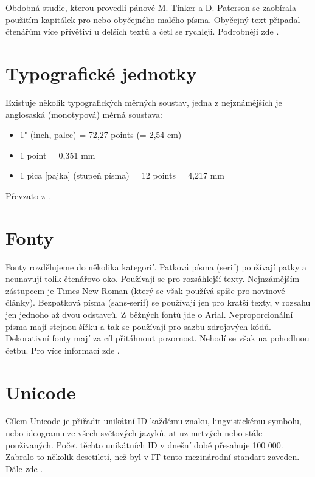 \documentclass[a4paper,11pt]{article}
\begin{document}
Obdobná studie, kterou provedli pánové M. Tinker a  D. Paterson se zaobírala použitím kapitálek pro nebo obyčejného malého písma. Obyčejný text připadal čtenářům více přívětiví u delších textů a četl se rychleji. Podrobněji zde \cite{Guthrie}.

\section{Typografické jednotky}
Existuje několik typografických měrných soustav, jedna z nejznámějších je anglosaská (monotypová) měrná soustava:
\begin{itemize}
    \item 1" (inch, palec) = 72,27 points (= 2,54 cm)
    \item 1 point = 0,351 mm
    \item 1 pica [pajka] (stupeň písma) = 12 points = 4,217 mm
\end{itemize}
Převzato z \cite{jednotky}.

\section{Fonty}
Fonty rozdělujeme do několika kategorií. Patková písma (serif) používají patky a neunavují tolik čtenářovo oko. Používají se pro rozsáhlejší texty. Nejnzámějším zástupcem je Times New Roman (který se však používá spíše pro novinové články).
Bezpatková písma (sans-serif) se používají jen pro kratší texty, v rozsahu jen jednoho až dvou odstavců. Z běžných fontů jde o Arial.
Neproporcionální písma mají stejnou šířku a tak se používají pro sazbu zdrojových kódů.
Dekorativní fonty mají za cíl přitáhnout pozornost. Nehodí se však na pohodlnou četbu. Pro více informací zde \cite{fonty}.

\section{Unicode}
Cílem Unicode je přiřadit unikátní ID každému znaku, lingvistickému symbolu, nebo ideogramu ze všech světových jazyků, at uz mrtvých nebo stále použivaných. Počet těchto unikátních ID v dnešní době přesahuje 100 000. Zabralo to několik desetiletí, než byl v IT tento mezinárodní standart zaveden. Dále zde \cite{unicode}.



\end{document}
